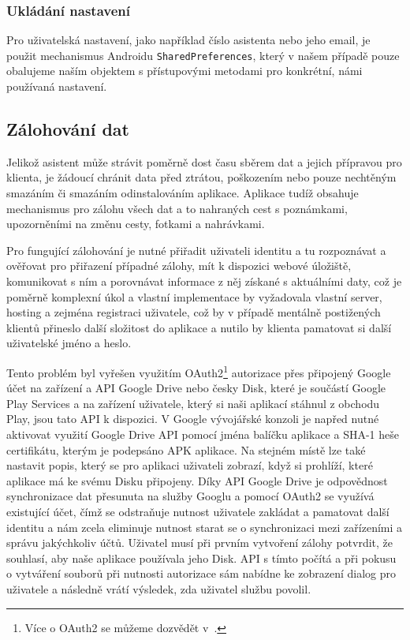 \documentclass[czech,master,public,dept460,male,java,cpdeclaration]{diploma}
\begin{document}
\subsubsection{Ukládání nastavení}
Pro uživatelská nastavení, jako například číslo asistenta nebo jeho email, je použit mechanismus Androidu
\texttt{SharedPreferences}, který v našem případě pouze obalujeme naším objektem s přístupovými
metodami pro konkrétní, námi používaná nastavení.


\subsection{Zálohování dat}
Jelikož asistent může strávit poměrně dost času sběrem dat a jejich přípravou pro klienta, je žádoucí chránit data před ztrátou,
poškozením nebo pouze nechtěným smazáním či smazáním odinstalováním aplikace. Aplikace tudíž obsahuje mechanismus pro zálohu všech
dat a to nahraných cest s poznámkami, upozorněními na změnu cesty, fotkami a nahrávkami.

Pro fungující zálohování je nutné přiřadit uživateli identitu a tu rozpoznávat a ověřovat pro přiřazení případné zálohy,
mít k dispozici webové úložiště, komunikovat s ním a porovnávat informace z něj získané s aktuálními daty,
což je poměrně komplexní úkol a vlastní implementace by
vyžadovala vlastní server, hosting a zejména registraci uživatele, což by v případě mentálně postižených klientů
přineslo další složitost do aplikace a nutilo by klienta pamatovat si další uživatelské jméno a heslo.

Tento problém byl vyřešen využitím OAuth2\footnote{Více o OAuth2 se můžeme dozvědět v~\cite{oauth2}.}
autorizace přes připojený Google účet na zařízení a API Google Drive nebo česky Disk,
 které je součástí Google Play Services a na zařízení uživatele, který si naši aplikací stáhnul z obchodu Play,
 jsou tato API k dispozici.
V Google vývojářské konzoli je napřed nutné aktivovat využití Google Drive API pomocí jména balíčku aplikace a SHA-1 heše
certifikátu, kterým je podepsáno APK aplikace. Na stejném místě lze také nastavit popis, který se pro aplikaci
uživateli zobrazí, když si prohlíží, které aplikace má ke svému Disku připojeny.
Díky API Google Drive je odpovědnost synchronizace dat přesunuta na služby Googlu a pomocí
OAuth2 se využívá existující účet, čímž se odstraňuje nutnost uživatele zakládat a pamatovat
 další identitu a nám zcela eliminuje nutnost starat se o synchronizaci mezi zařízeními a správu jakýchkoliv účtů.
 Uživatel musí při prvním vytvoření zálohy potvrdit, že souhlasí, aby naše aplikace používala jeho Disk.
 API s tímto počítá a při pokusu o vytváření souborů při nutnosti autorizace sám nabídne ke zobrazení
 dialog pro uživatele a následně vrátí výsledek, zda uživatel službu povolil.
\end{document}
